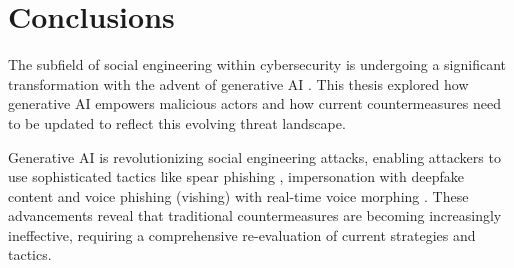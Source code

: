 


\chapter{Conclusions\label{chapter:conclusions}}
\begin{comment}

From course material:
    - "Yhteenveto vaatimattomimmillaan on vain lyhyt kertaus kirjoituksen keskeisistä asioista. Arvokkaamman yhteenvedon saa aikaan kommentoimalla työn tulosten arvoa, työn liittymistä ympäristöön ja tulevaisuudennäkymiä. Tällaiset arviot huolellisesti perusteltava."
    - "Yhteenvetoluku kuvaa teknisten johtopäätösten tuomaa impaktia."

\end{comment}

The subfield of social engineering within cybersecurity is undergoing a significant transformation with the advent of generative AI \citep{fakhouri_AI_Driven_Solutions_SE_Attacks_2024}. This thesis explored how generative AI empowers malicious actors and how current countermeasures need to be updated to reflect this evolving threat landscape.

Generative AI is revolutionizing social engineering attacks, enabling attackers to use sophisticated tactics like spear phishing \citep{basit_Comprehensive_Survey_AI_Phishing_Detection_2021}, impersonation with deepfake content \citep{mirsky_Creation_Detection_Deepfakes_2021} and voice phishing (vishing) with real-time voice morphing \citep{doan_BTSE_Audio_Deepfake_Detection_2023}. These advancements reveal that traditional countermeasures are becoming increasingly ineffective, requiring a comprehensive re-evaluation of current strategies and tactics.



